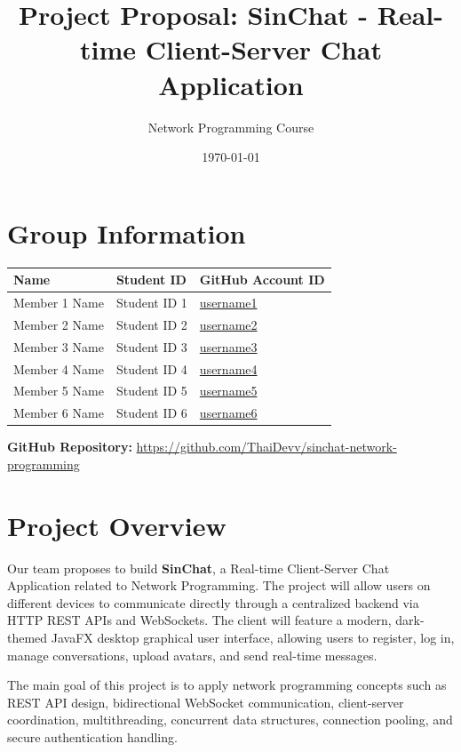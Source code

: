 \documentclass[11pt]{article}
\title{Project Proposal: SinChat - Real-time Client-Server Chat Application}
\author{Network Programming Course}
\date{\today}
\begin{document}
\maketitle

\section{Group Information}

\begin{longtable}{>{\raggedright\arraybackslash}p{} >{\raggedright\arraybackslash}p{} >{\raggedright\arraybackslash}p{}}
\toprule
\textbf{Name} & \textbf{Student ID} & \textbf{GitHub Account ID} \\
\midrule
Member 1 Name & Student ID 1 & \href{https://github.com/username1}{username1} \\
Member 2 Name & Student ID 2 & \href{https://github.com/username2}{username2} \\
Member 3 Name & Student ID 3 & \href{https://github.com/username3}{username3} \\
Member 4 Name & Student ID 4 & \href{https://github.com/username4}{username4} \\
Member 5 Name & Student ID 5 & \href{https://github.com/username5}{username5} \\
Member 6 Name & Student ID 6 & \href{https://github.com/username6}{username6} \\
\bottomrule
\end{longtable}

\textbf{GitHub Repository:} \url{https://github.com/ThaiDevv/sinchat-network-programming}

\section{Project Overview}

Our team proposes to build \textbf{SinChat}, a Real-time Client-Server Chat Application related to Network Programming. The project will allow users on different devices to communicate directly through a centralized backend via HTTP REST APIs and WebSockets. The client will feature a modern, dark-themed JavaFX desktop graphical user interface, allowing users to register, log in, manage conversations, upload avatars, and send real-time messages.

The main goal of this project is to apply network programming concepts such as REST API design, bidirectional WebSocket communication, client-server coordination, multithreading, concurrent data structures, connection pooling, and secure authentication handling.
\end{document}
